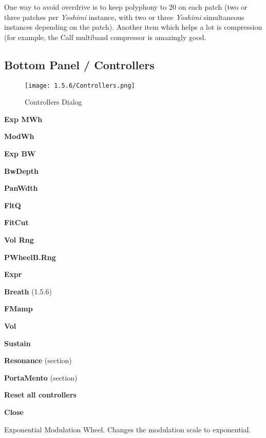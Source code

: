    One way to avoid overdrive is to keep polyphony to 20 on each patch (two
   or three patches per \textsl{Yoshimi} instance, with two or three
   \textsl{Yoshimi} simultaneous instances depending on the patch).
   Another item which helps a lot is compression (for example, the Calf
   multiband compressor is amazingly good.

\subsection{Bottom Panel / Controllers}
\label{subsec:bottom_panel_controllers}

\begin{figure}[H]
   \centering 
   \texttt{[image: 1.5.6/Controllers.png]}
   \caption{Controllers Dialog}
   \label{fig:controllers_dialog}
\end{figure}

   \begin{enumber}
      \item \textbf{Exp MWh}
      \item \textbf{ModWh}
      \item \textbf{Exp BW}
      \item \textbf{BwDepth}
      \item \textbf{PanWdth}
      \item \textbf{FltQ}
      \item \textbf{FitCut}
      \item \textbf{Vol Rng}
      \item \textbf{PWheelB.Rng}
      \item \textbf{Expr}
      \item \textbf{Breath} (1.5.6)
      \item \textbf{FMamp}
      \item \textbf{Vol}
      \item \textbf{Sustain}
      \item \textbf{Resonance} (section)
      \item \textbf{PortaMento} (section)
      \item \textbf{Reset all controllers}
      \item \textbf{Close}
   \end{enumber}

   \setcounter{ItemCounter}{0}      %

   Exponential Modulation Wheel.
   Changes the modulation scale to exponential.

